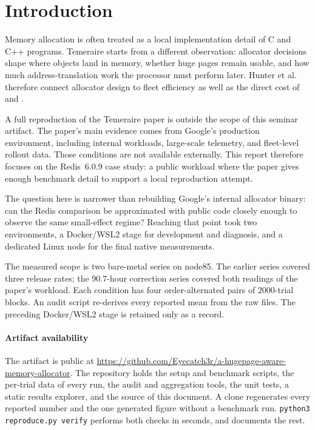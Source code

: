 \documentclass[sigconf]{acmart}
\DeclareRobustCommand{\code}[1]{\path{#1}}
\begin{document}
\maketitle

\section{Introduction}

Memory allocation is often treated as a local implementation detail of C and
C++ programs. Temeraire starts from a different observation: allocator decisions
shape where objects land in memory, whether huge pages remain usable, and how
much address-translation work the processor must perform later. Hunter et al.
therefore connect allocator design to fleet efficiency as well as the direct
cost of \code{malloc} and \code{free} \cite{273711}.

A full reproduction of the Temeraire paper is outside the scope of this seminar
artifact. The paper's main evidence comes from Google's production environment,
including internal workloads, large-scale telemetry, and fleet-level rollout
data. Those conditions are not available externally. This report therefore
focuses on the Redis~6.0.9 case study: a public workload where the paper gives
enough benchmark detail to support a local reproduction attempt.

The question here is narrower than rebuilding Google's internal allocator
binary: can the Redis comparison be approximated with public code closely enough
to observe the same small-effect regime? Reaching that point took two environments, a Docker/WSL2 stage for development
and diagnosis, and a dedicated Linux node for the final native measurements.

The measured scope is two bare-metal series on node85. The earlier series
covered three release rates; the 90.7-hour correction series covered both
readings of the paper's workload. Each condition has four order-alternated
pairs of 2000-trial blocks. An audit script re-derives every reported mean from
the raw files. The preceding Docker/WSL2 stage is retained only as a record.

\paragraph*{Artifact availability}
The artifact is public at
\url{https://github.com/Eyecatch3r/a-hugepage-aware-memory-allocator}. The
repository holds the setup and benchmark scripts, the per-trial data of every
run, the audit and aggregation tools, the unit tests, a static results
explorer, and the source of this document. A clone regenerates every reported number and the one generated figure without
a benchmark run. \texttt{python3 reproduce.py verify} performs both checks in
seconds, and \code{README.md} documents the rest.
\end{document}
